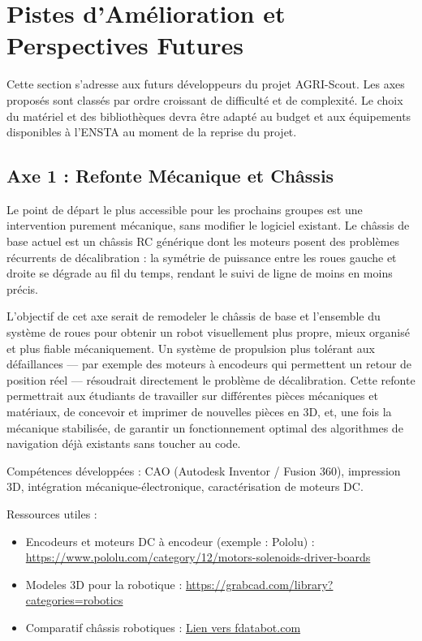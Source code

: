 \section{Pistes d'Amélioration et Perspectives Futures}
\label{sec:ameliorations}

Cette section s'adresse aux futurs développeurs du projet AGRI-Scout. Les axes proposés sont classés par ordre croissant de difficulté et de complexité. Le choix du matériel et des bibliothèques devra être adapté au budget et aux équipements disponibles à l'ENSTA au moment de la reprise du projet.

\subsection{Axe 1 : Refonte Mécanique et Châssis}

Le point de départ le plus accessible pour les prochains groupes est une intervention purement mécanique, sans modifier le logiciel existant. Le châssis de base actuel est un châssis RC générique dont les moteurs posent des problèmes récurrents de décalibration : la symétrie de puissance entre les roues gauche et droite se dégrade au fil du temps, rendant le suivi de ligne de moins en moins précis.

L'objectif de cet axe serait de remodeler le châssis de base et l'ensemble du système de roues pour obtenir un robot visuellement plus propre, mieux organisé et plus fiable mécaniquement. Un système de propulsion plus tolérant aux défaillances — par exemple des moteurs à encodeurs qui permettent un retour de position réel — résoudrait directement le problème de décalibration. Cette refonte permettrait aux étudiants de travailler sur différentes pièces mécaniques et matériaux, de concevoir et imprimer de nouvelles pièces en 3D, et, une fois la mécanique stabilisée, de garantir un fonctionnement optimal des algorithmes de navigation déjà existants sans toucher au code.

\noindent Compétences développées : CAO (Autodesk Inventor / Fusion 360), impression 3D, intégration mécanique-électronique, caractérisation de moteurs DC.

\noindent Ressources utiles :
\begin{itemize}
    \item Encodeurs et moteurs DC à encodeur (exemple : Pololu) : \url{https://www.pololu.com/category/12/motors-solenoids-driver-boards}
    \item Modeles 3D pour la robotique : \url{https://grabcad.com/library?categories=robotics}
    \item Comparatif châssis robotiques : \href{https://www.fdatabot.com/top-10-mobile-robot-chassis-compared-types-features-selection-guide/}{Lien vers fdatabot.com}
\end{itemize}

